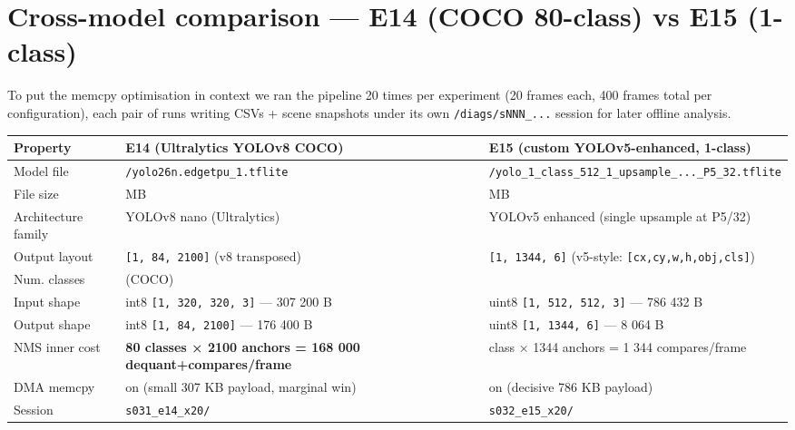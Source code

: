 \section{Cross-model comparison --- E14 (COCO 80-class) vs E15
(1-class)}\label{cross-model-comparison-e14-coco-80-class-vs-e15-1-class}

To put the memcpy optimisation in context we ran the pipeline 20 times
per experiment (20 frames each, 400 frames total per configuration),
each pair of runs writing CSVs + scene snapshots under its own
\texttt{/diags/sNNN\_...} session for later offline analysis.

{\def\LTcaptype{none} %
\begin{longtable}[]{@{}
  >{\raggedright\arraybackslash}p{}
  >{\raggedright\arraybackslash}p{}
  >{\raggedright\arraybackslash}p{}@{}}
\toprule\noalign{}
\begin{minipage}[b]{\linewidth}\raggedright
Property
\end{minipage} & \begin{minipage}[b]{\linewidth}\raggedright
E14 (Ultralytics YOLOv8 COCO)
\end{minipage} & \begin{minipage}[b]{\linewidth}\raggedright
E15 (custom YOLOv5-enhanced, 1-class)
\end{minipage} \\
\midrule\noalign{}
\endhead
\bottomrule\noalign{}
\endlastfoot
Model file & \texttt{/yolo26n.edgetpu\_1.tflite} &
\texttt{/yolo\_1\_class\_512\_1\_upsample\_...\_P5\_32.tflite} \\
File size & 4.41 MB & 5.33 MB \\
Architecture family & YOLOv8 nano (Ultralytics) & YOLOv5 enhanced
(single upsample at P5/32) \\
Output layout & \texttt{{[}1,\ 84,\ 2100{]}} (v8 transposed) &
\texttt{{[}1,\ 1344,\ 6{]}} (v5-style:
\texttt{{[}cx,cy,w,h,obj,cls{]}}) \\
Num. classes & 80 (COCO) & 1 \\
Input shape & int8 \texttt{{[}1,\ 320,\ 320,\ 3{]}} --- 307 200 B &
uint8 \texttt{{[}1,\ 512,\ 512,\ 3{]}} --- 786 432 B \\
Output shape & int8 \texttt{{[}1,\ 84,\ 2100{]}} --- 176 400 B & uint8
\texttt{{[}1,\ 1344,\ 6{]}} --- 8 064 B \\
NMS inner cost & \textbf{80 classes × 2100 anchors = 168 000
dequant+compares/frame} & 1 class × 1344 anchors = 1 344
compares/frame \\
DMA memcpy & on (small 307 KB payload, marginal win) & on (decisive 786
KB payload) \\
Session & \texttt{s031\_e14\_x20/} & \texttt{s032\_e15\_x20/} \\
\end{longtable}
}

